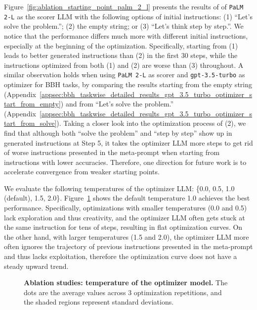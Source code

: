 Figure~\ref{fig:ablation_starting_point_palm_2_l} presents the results of  of \texttt{PaLM 2-L} as the scorer LLM  with the following options of initial instructions: (1) ``Let's solve the problem.''; (2) the empty string; or (3) ``Let's think step by step.''. We notice that the performance differs much more with different initial instructions, especially at the beginning of the optimization.
Specifically, starting from (1) leads to better generated instructions than (2) in the first 30 steps, while the instructions optimized from both (1) and (2) are worse than (3) throughout.
A similar observation holds when using \texttt{PaLM 2-L} as scorer and \texttt{gpt-3.5-turbo} as optimizer for BBH tasks, by comparing the results starting from the empty string (Appendix~\ref{appsec:bbh_taskwise_detailed_results_gpt_3.5_turbo_optimizer_start_from_empty}) and from ``Let's solve the problem.'' (Appendix~\ref{appsec:bbh_taskwise_detailed_results_gpt_3.5_turbo_optimizer_start_from_solve}).
Taking a closer look into the optimization process of (2), we find that although both ``solve the problem'' and ``step by step'' show up in generated instructions at Step 5, it takes the optimizer LLM more steps to get rid of worse instructions presented in the meta-prompt when starting from instructions with lower accuracies.
Therefore, one direction for future work is to accelerate convergence from weaker starting points.

We evaluate the following temperatures of the optimizer LLM: \{0.0, 0.5, 1.0 (default), 1.5, 2.0\}.
Figure~\ref{fig:ablation_temperature} shows the default temperature 1.0 achieves the best performance.
Specifically, optimizations with smaller temperatures (0.0 and 0.5) lack exploration and thus creativity, and the optimizer LLM often gets stuck at the same instruction for tens of steps, resulting in flat optimization curves.
On the other hand, with larger temperatures (1.5 and 2.0), the optimizer LLM more often ignores the trajectory of previous instructions presented in the meta-prompt and thus lacks exploitation, therefore the optimization curve does not have a steady upward trend.

\begin{figure}[t]
\centering
{}
\hspace{.01\linewidth}
\caption{\textbf{Ablation studies: temperature of the optimizer model.} 
The dots are the average values across 3 optimization repetitions, and the shaded regions represent standard deviations.
}
\label{fig:ablation_temperature}
\end{figure}

